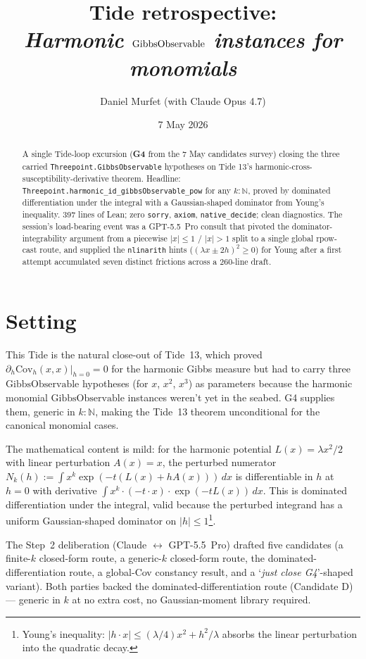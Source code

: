 \documentclass[11pt]{article}
\title{Tide retrospective:\\\emph{Harmonic \texorpdfstring{$\GO$}{GibbsObservable}
  instances for monomials}}
\author{Daniel Murfet (with Claude Opus 4.7)}
\date{7 May 2026}
\newcommand{\GO}{\mathrm{GibbsObservable}}
\begin{document}
\maketitle

\begin{abstract}
A single Tide-loop excursion (\textbf{G4} from the 7 May
candidates survey) closing the three carried
\texttt{Threepoint.GibbsObservable} hypotheses on Tide 13's
harmonic-cross-susceptibility-derivative theorem. Headline:
\texttt{Threepoint.harmonic\_id\_gibbsObservable\_pow} for any
\(k : \mathbb{N}\), proved by dominated differentiation under the
integral with a Gaussian-shaped dominator from Young's inequality.
397 lines of Lean; zero \texttt{sorry}, \texttt{axiom}, \texttt{native\_decide};
clean diagnostics. The session's load-bearing event was a GPT-5.5~Pro
consult that pivoted the dominator-integrability argument from a
piecewise \(|x| \le 1\) / \(|x| > 1\) split to a single global rpow-cast
route, and supplied the \texttt{nlinarith} hints (\((\lambda x \pm 2h)^2 \ge 0\))
for Young after a first attempt accumulated seven distinct frictions
across a 260-line draft.
\end{abstract}

\section{Setting}

This Tide is the natural close-out of Tide~13, which proved
\(\partial_h \mathrm{Cov}_h(x, x)\big|_{h=0} = 0\) for the harmonic Gibbs
measure but had to carry three \(\GO\) hypotheses (for \(x\), \(x^2\),
\(x^3\)) as parameters because the harmonic monomial \(\GO\) instances
weren't yet in the seabed. G4 supplies them, generic in
\(k : \mathbb{N}\), making the Tide~13 theorem unconditional for the
canonical monomial cases.

The mathematical content is mild: for the harmonic potential
\(L(x) = \lambda x^2/2\) with linear perturbation \(A(x) = x\), the
perturbed numerator
\(N_k(h) := \int x^k \exp(-t(L(x) + h A(x)))\,dx\)
is differentiable in \(h\) at \(h = 0\) with derivative
\(\int x^k \cdot (-t \cdot x) \cdot \exp(-t L(x))\,dx\). This is dominated
differentiation under the integral, valid because the perturbed
integrand has a uniform Gaussian-shaped dominator on
\(|h| \le 1\)\footnote{Young's inequality: \(|h \cdot x| \le (\lambda/4) x^2 + h^2/\lambda\)
absorbs the linear perturbation into the quadratic decay.}.

The Step~2 deliberation (Claude $\leftrightarrow$ GPT-5.5~Pro) drafted
five candidates (a finite-\(k\) closed-form route, a generic-\(k\)
closed-form route, the dominated-differentiation route, a global-Cov
constancy result, and a `\textit{just close G4}'-shaped variant). Both
parties backed the dominated-differentiation route (Candidate D) — generic
in \(k\) at no extra cost, no Gaussian-moment library required.
\end{document}
